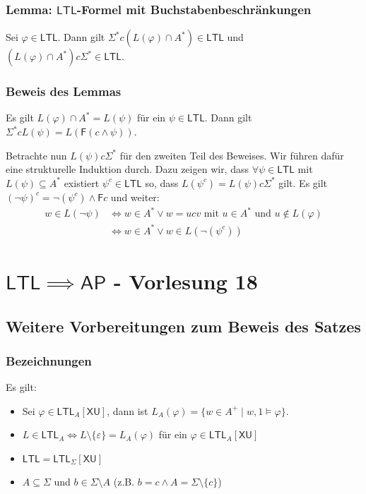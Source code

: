 \documentclass[12pt, german]{article}
\newcommand{\sigstern}{\Sigma^\ast}
\newcommand{\aast}{A^{\ast}}
\newcommand{\ap}{\mathsf{AP}}
\newcommand{\ltl}{\mathsf{LTL}}
\newcommand{\sX}{\mathsf{X}}
\newcommand{\sF}{\mathsf{F}}
\newcommand{\sU}{\mathsf{U}}
\begin{document}
\subsubsection{Lemma: $\ltl$-Formel mit Buchstabenbeschränkungen}
	\label{sec:ltl_buchstaben}
	Sei $\varphi \in \ltl$. Dann gilt $\sigstern c (L(\varphi) \cap \aast) \in \ltl$ und $(L(\varphi) \cap \aast)c \sigstern \in \ltl$.
	
\subsubsection{Beweis des Lemmas}
	Es gilt $L(\varphi) \cap \aast = L(\psi)$ für ein $\psi \in \ltl$. Dann gilt $\sigstern c L(\psi) = L(\sF(c \land \psi))$. \newline
	
	Betrachte nun  $L(\psi) c \sigstern$ für den zweiten Teil des Beweises. Wir führen dafür eine strukturelle Induktion durch. 
	Dazu zeigen wir, dass $\forall \psi \in \ltl$ mit $L(\psi) \subseteq \aast$ existiert $\psi^c \in \ltl$ so, dass $L(\psi^c) = L(\psi) c \sigstern$ gilt. Es gilt $(\neg \psi )^c = \neg (\psi^c) \land \sF c$ und weiter: 
	\begin{align*}
		w \in L(\neg \psi) &\iff w \in \aast \lor w = ucv \text{ mit } u \in \aast \text{ und } u \not \in L(\varphi) \\
		&\iff w \in \aast \lor w \in L(\neg(\psi^c))
	\end{align*}

\section{$\ltl \implies \ap$ - Vorlesung 18}
\subsection{Weitere Vorbereitungen zum Beweis des Satzes}
\subsubsection{Bezeichnungen}
	Es gilt: 
	\begin{itemize}
		\item Sei $\varphi \in \ltl_A[\sX\sU]$, dann ist $L_A(\varphi) = \{w \in A^+ \mid w,1 \models \varphi\}$.
		\item $L \in \ltl_A \iff L \setminus \{\varepsilon\} = L_A(\varphi)$ für ein $\varphi \in \ltl_A[\sX\sU]$
		\item $\ltl = \ltl_\Sigma[\sX\sU]$
		\item $A \subseteq \Sigma$ und $b \in \Sigma \setminus A$ (z.B. $b = c \land A = \Sigma \setminus \{c\}$)
	\end{itemize}
\end{document}
